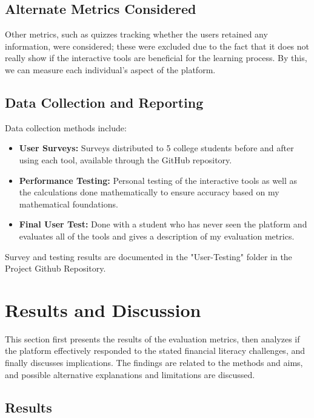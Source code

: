 \documentclass[11pt,twocolumn]{article}
\begin{document}
\subsection{Alternate Metrics Considered}
Other metrics, such as quizzes tracking whether the users retained any information, were considered; these were excluded due to the fact that it does not really show if the interactive tools are beneficial for the learning process. By this, we can measure each individual's aspect of the platform.

\subsection{Data Collection and Reporting}
Data collection methods include:
\begin{itemize}
    \item \textbf{User Surveys:} Surveys distributed to 5 college students before and after using each tool, available through the GitHub repository.
    \item \textbf{Performance Testing:} Personal testing of the interactive tools as well as the calculations done mathematically to ensure accuracy based on my mathematical foundations. 
    \item \textbf{Final User Test:} Done with a student who has never seen the platform and evaluates all of the tools and gives a description of my evaluation metrics.
    
\end{itemize}

Survey and testing results are documented in the "User-Testing" folder in the Project Github Repository. 


\section{Results and Discussion}

This section first presents the results of the evaluation metrics, then analyzes if the platform effectively responded to the stated financial literacy challenges, and finally discusses implications. The findings are related to the methods and aims, and possible alternative explanations and limitations are discussed.

\subsection{Results}
\end{document}
